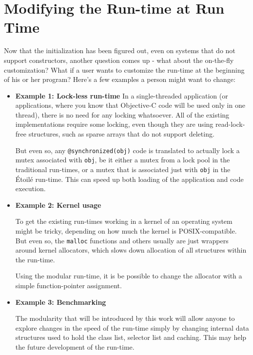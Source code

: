 \section{Modifying the Run-time at Run Time}

Now that the initialization has been figured out, even on systems that do not support constructors, another question comes up - what about the on-the-fly customization? What if a user wants to customize the run-time at the beginning of his or her program? Here's a few examples a person might want to change:

\begin{itemize}
\item{\bf{Example 1: Lock-less run-time}}
In a single-threaded application (or applications, where you know that Objective-C code will be used only in one thread), there is no need for any locking whatsoever. All of the existing implementations require some locking, even though they are using read-lock-free structures, such as sparse arrays that do not support deleting.

But even so, any \verb=@synchronized(obj)= code is translated to actually lock a mutex associated with \verb=obj=, be it either a mutex from a lock pool in the traditional run-times, or a mutex that is associated just with \verb=obj= in the \'Etoil\'e run-time. This can speed up both loading of the application and code execution.

\item{\bf{Example 2: Kernel usage}}

To get the existing run-times working in a kernel of an operating system might be tricky, depending on how much the kernel is POSIX-compatible. But even so, the \verb=malloc= functions and others usually are just wrappers around kernel allocators, which slows down allocation of all structures within the run-time.

Using the modular run-time, it is be possible to change the allocator with a simple function-pointer assignment.

\item{\bf{Example 3: Benchmarking}}

The modularity that will be introduced by this work will allow anyone to explore changes in the speed of the run-time simply by changing internal data structures used to hold the class list, selector list and caching. This may help the future development of the run-time.

\end{itemize}

